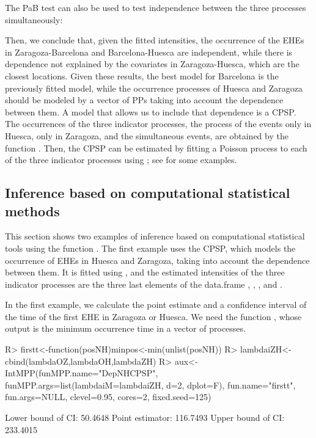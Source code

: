 The PaB test can also be used  to test  independence between the three processes simultaneously:
														
																	
Then,  we conclude that, given the fitted  intensities, the occurrence of the EHEs in Zaragoza-Barcelona and Barcelona-Huesca are independent,  while there is  dependence not explained by the covariates in  Zaragoza-Huesca, which are the closest locations. Given these results,   the best model for Barcelona is the previously fitted  model, while the  occurrence processes of Huesca and  Zaragoza should be modeled by a vector of PPs taking into account the dependence between them. A  model  that allows us to include that  dependence  is a CPSP. The occurrences of the three  indicator processes, the process of the events only in Huesca,  only in Zaragoza, and the simultaneous events,  are obtained by the function . Then,   the CPSP can be estimated by fitting a Poisson process to each of the  three indicator processes using ; see \citet{Cebrian15} for some examples.
																	
																	
\subsection{Inference  based on computational statistical  methods}
																	
																	
This section   shows two examples of inference based on computational statistical tools using the function . The first example uses the CPSP,  which models the occurrence of EHEs in Huesca and Zaragoza, taking into account the dependence between them.  It is fitted using , and the estimated intensities of the  three indicator processes are  the three last elements of the data.frame , , , and .
																	
In the first example,  we calculate  the point estimate and a confidence interval of the time of the first EHE in Zaragoza or Huesca. We need the function , whose output is the minimum occurrence time  in  a vector of processes.
\begin{example}
R> firstt<-function(posNH){minpos<-min(unlist(posNH))}
R> lambdaiZH<-cbind(lambdaOZ,lambdaOH,lambdaZH)
R> aux<-IntMPP(funMPP.name="DepNHCPSP", 
       funMPP.args=list(lambdaiM=lambdaiZH, d=2, dplot=F), 
       fun.name="firstt", fun.args=NULL, clevel=0.95, cores=2, fixed.seed=125) 

  Lower  bound  of CI:  50.4648
  Point estimator:  116.7493
  Upper bound of CI:  233.4015
\end{example}
																																
